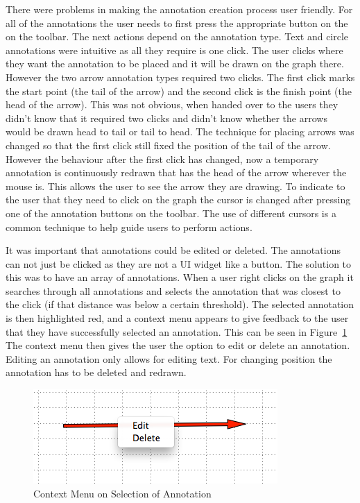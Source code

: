 There were problems in making the annotation creation process user friendly.  For all of the annotations the user needs to first press the appropriate button on the on the toolbar.  The next actions depend on the annotation type.  Text and circle annotations were intuitive as all they require is one click.  The user clicks where they want the annotation to be placed and it will be drawn on the graph there.  However the two arrow annotation types required two clicks.  The first click marks the start point (the tail of the arrow) and the second click is the finish point (the head of the arrow).  This was not obvious, when handed over to the users they didn't know that it required two clicks and didn't know whether the arrows would be drawn head to tail or tail to head.  The technique for placing arrows was changed so that the first click still fixed the position of the tail of the arrow. However the behaviour after the first click has changed, now a temporary annotation is continuously redrawn that has the head of the arrow wherever the mouse is.  This allows the user to see the arrow they are drawing.  To indicate to the user that they need to click on the graph the cursor is changed after pressing one of the annotation buttons on the toolbar.  The use of different cursors is a common technique to help guide users to perform actions.

It was important that annotations could be edited or deleted.  The annotations can not just be clicked as they are not a \ac{UI} widget like a button.  The solution to this was to have an array of annotations.  When a user right clicks on the graph it searches through all annotations and selects the annotation that was closest to the click (if that distance was below a certain threshold).  The selected annotation is then highlighted red, and a context menu appears to give feedback to the user that they have successfully selected an annotation.  This can be seen in Figure~\ref{fig:annotation_selection}  The context menu then gives the user the option to edit or delete an annotation.  Editing an annotation only allows for editing text.  For changing position the annotation has to be deleted and redrawn.

\begin{figure}[h!]
    \centering
    \includegraphics[width=\textwidth]{images/annotation_selection.png}
    \caption{Context Menu on Selection of Annotation}
    \label{fig:annotation_selection}
\end{figure}


